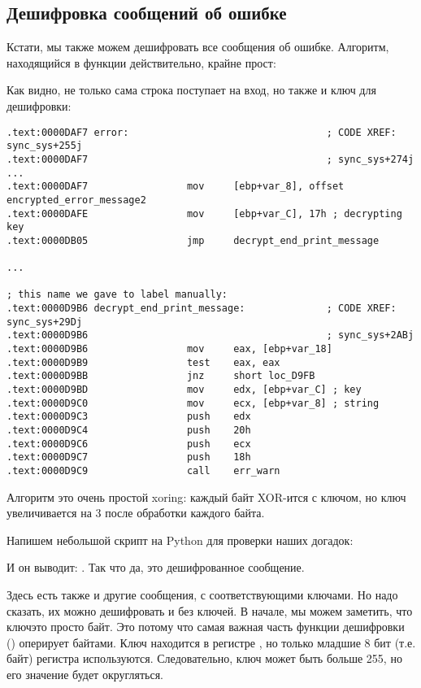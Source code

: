 \subsection{Дешифровка сообщений об ошибке}

Кстати, мы также можем дешифровать все сообщения об ошибке.
Алгоритм, находящийся в функции  
действительно, крайне прост:



Как видно, не только сама строка поступает на вход, но также и ключ для дешифровки:

\begin{lstlisting}
.text:0000DAF7 error:                                  ; CODE XREF: sync_sys+255j
.text:0000DAF7                                         ; sync_sys+274j ...
.text:0000DAF7                 mov     [ebp+var_8], offset encrypted_error_message2
.text:0000DAFE                 mov     [ebp+var_C], 17h ; decrypting key
.text:0000DB05                 jmp     decrypt_end_print_message

...

; this name we gave to label manually:
.text:0000D9B6 decrypt_end_print_message:              ; CODE XREF: sync_sys+29Dj
.text:0000D9B6                                         ; sync_sys+2ABj
.text:0000D9B6                 mov     eax, [ebp+var_18]
.text:0000D9B9                 test    eax, eax
.text:0000D9BB                 jnz     short loc_D9FB
.text:0000D9BD                 mov     edx, [ebp+var_C] ; key
.text:0000D9C0                 mov     ecx, [ebp+var_8] ; string
.text:0000D9C3                 push    edx
.text:0000D9C4                 push    20h
.text:0000D9C6                 push    ecx
.text:0000D9C7                 push    18h
.text:0000D9C9                 call    err_warn
\end{lstlisting}

Алгоритм это очень простой \gls{xoring}: 
каждый байт XOR-ится с ключом, но ключ увеличивается на 3 после обработки каждого байта.

Напишем небольшой скрипт на Python для проверки наших догадок:



И он выводит: .
Так что да, это дешифрованное сообщение.

Здесь есть также и другие сообщения, с соответствующими ключами.
Но надо сказать, их можно дешифровать и без ключей.
В начале, мы можем заметить, что ключ\EMDASH{}это просто байт.
Это потому что самая важная часть функции дешифровки
(\XOR) оперирует байтами. 
Ключ находится в регистре \ESI, но только младшие 8 бит
(т.е. байт) регистра используются.
Следовательно, ключ может быть больше 255, 
но его значение будет округляться.

